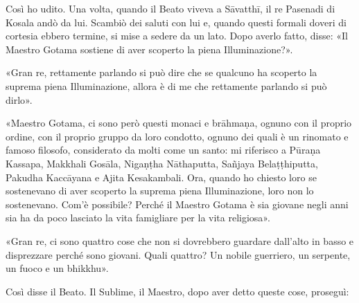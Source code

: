  Così ho udito. Una volta, quando il Beato viveva a Sāvatthī,
il re Pasenadi di Kosala andò da lui. Scambiò dei saluti con lui e, quando
questi formali doveri di cortesia ebbero termine, si mise a sedere da un lato.
Dopo averlo fatto, disse: «Il Maestro Gotama sostiene di aver scoperto la piena
Illuminazione?».

«Gran re, rettamente parlando si può dire che se qualcuno ha scoperto la suprema
piena Illuminazione, allora è di me che rettamente parlando si può dirlo».

«Maestro Gotama, ci sono però questi monaci e brāhmaṇa, ognuno con il proprio
ordine, con il proprio gruppo da loro condotto, ognuno dei quali è un rinomato e
famoso filosofo, considerato da molti come un santo: mi riferisco a Pūraṇa
Kassapa, Makkhali Gosāla, Nigaṇṭha Nāthaputta, Sañjaya Belaṭṭhiputta, Pakudha
Kaccāyana e Ajita Kesakambali. Ora, quando ho chiesto loro se sostenevano di
aver scoperto la suprema piena Illuminazione, loro non lo sostenevano. Com’è
possibile? Perché il Maestro Gotama è sia giovane negli anni sia ha da poco
lasciato la vita famigliare per la vita religiosa».

«Gran re, ci sono quattro cose che non si dovrebbero guardare dall’alto in basso
e disprezzare perché sono giovani. Quali quattro? Un nobile guerriero, un
serpente, un fuoco e un bhikkhu».

Così disse il Beato. Il Sublime, il Maestro, dopo aver detto queste cose,
proseguì:

